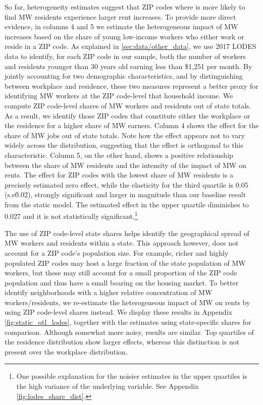So far, heterogeneity estimates suggest that ZIP codes where is more likely to find MW residents 
experience larger rent increases. To provide more direct evidence, in columns 4 and 5 we estimate 
the heterogeneous impact of MW increases based on the share of young low-income workers who 
either work or reside in a ZIP code. As explained in \autoref{sec:data/other_data}, we use 2017 
LODES data to identify, for each ZIP code in our sample, both the number of workers and residents 
younger than 30 years old earning less than \$1,251 per month.
By jointly accounting for two demographic characteristics, and by distinguishing between 
workplace and residence, these two measures represent a better proxy for identifying MW workers 
at the ZIP code-level that household income. We compute ZIP code-level shares of MW workers and 
residents out of state totals. As a result, we identify those ZIP codes that constitute either 
the workplace or the residence for a higher share of MW earners. Column 4 shows the effect for 
the share of MW jobs out of state totals. Note how the effect appears not to vary widely across 
the distribution, suggesting that the effect is orthogonal to this characteristic. Column 5, on 
the other hand, shows a positive relationship between the share of MW residents and the intensity 
of the impact of MW on rents. The effect for ZIP codes with the lowest share of MW residents is a 
precisely estimated zero effect, while the elasticity for the third quartile is 0.05 (s.e\. 0.02), 
strongly significant and larger in magnitude than our baseline result from the static model. The 
estimated effect in the upper quartile diminishes to 0.027 and it is not statistically 
significant.\footnote{\label{ft:long_tail} One possible explanation for the noisier estimates in 
	the upper quartiles is the high variance of the underlying variable. See Appendix 
	\autoref{fig:lodes_share_dist}.}

The use of ZIP code-level state shares helps identify the geographical spread of MW workers and 
residents within a state. This approach however, does not account for a ZIP code's population 
size. For example, richer and highly populated ZIP codes may host a large fraction of the state 
population of MW workers, but these may still account for a small proportion of the ZIP code 
population and thus have a small bearing on the housing market. To better identify neighborhoods 
with a higher relative concentration of MW workers/residents, we re-estimate the heterogeneous 
impact of MW on rents by using ZIP code-level shares instead. We display these results 
in Appendix \autoref{fig:static_qtl_lodes}, together with the estimates using state-specific 
shares for comparison. Although somewhat more noisy, results are similar. Top quartiles of the 
residence distribution show larger effects, whereas this distinction is not present over the 
workplace distribution.
